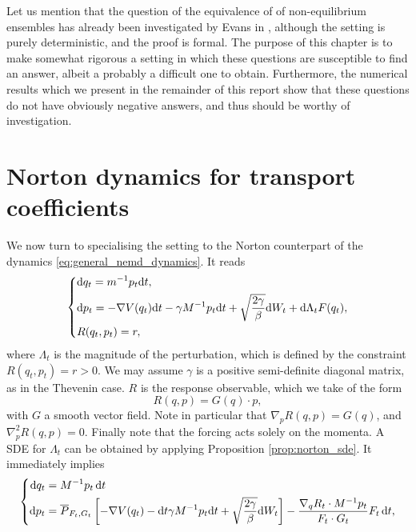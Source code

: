 Let us mention that the question of the equivalence of of non-equilibrium ensembles has already been investigated by Evans in \cite{E93}, although the setting is purely deterministic, and the proof is formal.
The purpose of this chapter is to make somewhat rigorous a setting in which these questions are susceptible to find an answer, albeit a probably a difficult one to obtain.
Furthermore, the numerical results which we present in the remainder of this report show that these questions do not have obviously negative answers, and thus should be worthy of investigation.

\section{Norton dynamics for transport coefficients}
We now turn to specialising the setting to the Norton counterpart of the dynamics \eqref{eq:general_nemd_dynamics}. It reads
\begin{equation}
    \label{eq:norton_dynamics_general}
    \left\{ 
        \begin{aligned}
            &\mathrm{d} q_t=m^{-1}p_t\mathrm{d} t,\\
            &\mathrm{d} p_t=-\nabla V(q_t)\mathrm{d} t-\gamma M^{-1}p_t\mathrm{d} t +\sqrt{\frac{2\gamma}\beta}\mathrm{d} W_t +\mathrm{d} \Lambda_t F(q_t),\\
            &R(q_t,p_t)=r,
        \end{aligned}
    \right.
\end{equation}
where $\Lambda_t$ is the magnitude of the perturbation, which is defined by the constraint $R(q_t,p_t)=r>0$.
We may assume $\gamma$ is a positive semi-definite diagonal matrix, as in the Thevenin case. $R$ is the response observable, which we take of the form
\[R(q,p)=G(q)\cdot p,\]
with $G$ a smooth vector field. Note in particular that $\nabla_p R(q,p)=G(q)$, and $\nabla_p^2 R(q,p)=0$. Finally note that the forcing acts solely on the momenta.
A SDE for $\Lambda_t$ can be obtained by applying Proposition \ref{prop:norton_sde}.
It immediately implies 
\begin{equation}
    \label{eq:norton_dynamics_general_solved}
    \left\{
        \begin{aligned}
            \mathrm{d} q_t &= M^{-1}p_t \,\mathrm{d} t\\
            \mathrm{d} p_t &= \overline{P}_{F_t,G_t}\left[-\nabla V(q_t)-\mathrm{d} t\gamma M^{-1}p_t\mathrm{d} t + \sqrt{\frac{2\gamma}{\beta}}\mathrm{d} W_t\right] - \frac{\nabla_q R_t\cdot M^{-1}p_t}{F_t\cdot G_t}F_t\,\mathrm{d} t,
        \end{aligned}\right.
\end{equation}
